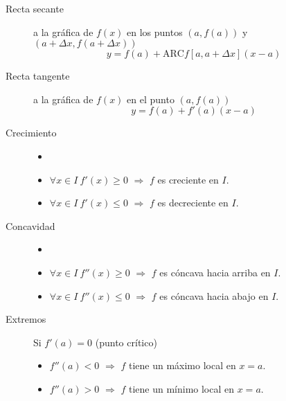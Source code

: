 \begin{multicols}{2}
\begin{tcolorbox}[hbox, title=Rectas secante y tangente]
\begin{minipage}{0.4\textwidth}
\flushleft
\begin{description}
\item[Recta secante] a la gráfica de $f(x)$ en los puntos $(a,f(a))$ y $(a+\Delta x, f(a+\Delta x))$
      \[
      y=f(a)+\mbox{ARC}f[a,a+\Delta x](x-a)
      \]
\item[Recta tangente] a la gráfica de $f(x)$ en el punto $(a,f(a))$
      \[
      y=f(a)+f'(a)(x-a)
      \]
\end{description}
\end{minipage}
\end{tcolorbox}

\begin{tcolorbox}[hbox, title={Crecimiento, concavidad y extremos}]
\begin{minipage}{0.4\textwidth}
\flushleft
\begin{description}
\item[Crecimiento]
      \begin{itemize}
      \item[]
      \item $\forall x\in I\ f'(x)\geq 0$ $\Rightarrow$ $f$ es creciente en $I$.
      \item $\forall x\in I\ f'(x)\leq 0$ $\Rightarrow$ $f$ es decreciente en $I$.
      \end{itemize}
\item[Concavidad]
      \begin{itemize}
      \item[]
      \item $\forall x\in I\ f''(x)\geq 0$ $\Rightarrow$ $f$ es cóncava hacia arriba en $I$.
      \item $\forall x\in I\ f''(x)\leq 0$ $\Rightarrow$ $f$ es cóncava hacia abajo en $I$.
      \end{itemize}
\item[Extremos] Si $f'(a)=0$ (punto crítico)
      \begin{itemize}
      \item $f''(a)<0$ $\Rightarrow$ $f$ tiene un máximo local en $x=a$.
      \item $f''(a)>0$ $\Rightarrow$ $f$ tiene un mínimo local en $x=a$.
      \end{itemize}
\end{description}
\end{minipage}
\end{tcolorbox}


\end{multicols}
